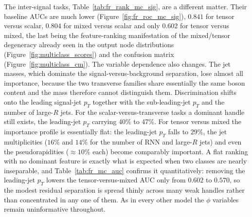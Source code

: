 The inter-signal tasks, Table~\ref{tab:fr_rank_mc_sig}, are a different matter. Their baseline AUCs are much lower (Figure~\ref{fig:fr_roc_mc_sig}), $0.841$ for tensor versus scalar, $0.804$ for mixed versus scalar and only $0.602$ for tensor versus mixed, the last being the feature-ranking manifestation of the mixed/tensor degeneracy already seen in the output node distributions (Figure~\ref{fig:multiclass_scores}) and the confusion matrix (Figure~\ref{fig:multiclass_cm}). The variable dependence also changes. The jet masses, which dominate the signal-versus-background separation, lose almost all importance, because the two transverse families share essentially the same boson content and the mass therefore cannot distinguish them. Discrimination shifts onto the leading signal-jet $p_T$ together with the sub-leading-jet $p_T$ and the number of large-$R$ jets. For the scalar-versus-transverse tasks a dominant handle still exists, the leading-jet $p_T$ carrying 40\% to 47\%. For tensor versus mixed the importance profile is essentially flat: the leading-jet $p_T$ falls to $29\%$, the jet multiplicities ($16\%$ and $14\%$ for the number of RNN and large-$R$ jets) and even the pseudorapidities ($\approx10\%$ each) become comparably important. A flat ranking with no dominant feature is exactly what is expected when two classes are nearly inseparable, and Table~\ref{tab:fr_mc_auc} confirms it quantitatively: removing the leading-jet $p_T$ lowers the tensor-versus-mixed AUC only from $0.602$ to $0.570$, so the modest residual separation is spread thinly across many weak handles rather than concentrated in any one of them. As in every other model the $\phi$ variables remain uninformative throughout.

